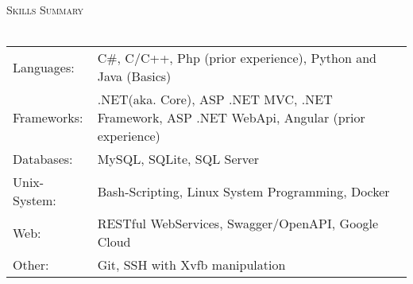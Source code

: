 \documentclass[a4paper]{article}
\newcommand{\lineunder} {
    \vspace*{-8pt} \\
    \hspace*{-18pt} \hrulefill \\
}
\newcommand{\header} [1] {
    {\hspace*{-18pt}\vspace*{6pt} \textsc{#1}}
    \vspace*{-6pt} \lineunder
}
\begin{document}
\header{Skills Summary}
\begin{tabular}{ l l }
	\\
	Languages:   & C\#, C/C++, Php (prior experience), Python and Java (Basics)        \\
	Frameworks:  & .NET(aka. Core), ASP .NET MVC, .NET Framework, ASP .NET WebApi, Angular  (prior experience) \\
	Databases:   & MySQL, SQLite, SQL Server                                               \\
	Unix-System: & Bash-Scripting, Linux System Programming, Docker                        \\
	Web:         & RESTful WebServices, Swagger/OpenAPI, Google Cloud                      \\
	Other:       & Git, SSH with Xvfb manipulation         \\
\end{tabular}
\vspace{2mm}
\end{document}
